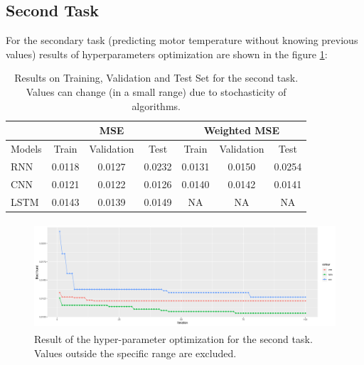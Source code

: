 

\subsection{Second Task}
For the secondary task (predicting motor temperature without knowing previous values) results of hyperparameters optimization are shown in the figure \ref{fig:second_task}:
\begin{table}[!h]
  \centering
  \begin{tabular}{|l|c|c|c|c|c|c|}
    \hline
    & \multicolumn{3}{|c|}{MSE} & \multicolumn{3}{|c|}{Weighted MSE} \\
    \hline
    Models & Train & Validation & Test   & Train  & Validation & Test \\
    \hline
    RNN   & 0.0118 & 0.0127     & 0.0232 & 0.0131 & 0.0150     &  0.0254\\
    CNN   & 0.0121 & 0.0122     & 0.0126 & 0.0140 & 0.0142     & 0.0141\\
    LSTM  & 0.0143 & 0.0139     & 0.0149 & NA     & NA         & NA\\
    \hline
  \end{tabular}
  \caption{Results on Training, Validation and Test Set for the second task. Values can change (in a small range) due to stochasticity of algorithms.}
  \label{tab:first}
\end{table}

\begin{figure}[!h]
    \centering
    \includegraphics[width=\linewidth, height=4cm]{imgs/comparison_MSE_second.png}
    \caption{Result of the hyper-parameter optimization for the second task. Values outside the specific range are excluded.}
    \label{fig:second_task}
\end{figure}
  

